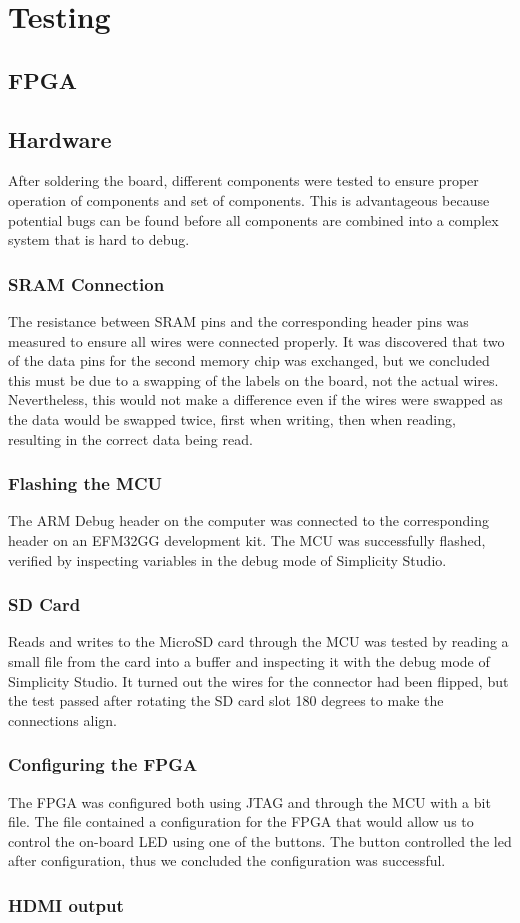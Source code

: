\section{Testing}


\subsection{FPGA}


\subsection{Hardware}
After soldering the board, different components were tested to ensure proper operation of components and set of components.
This is advantageous because potential bugs can be found before all components are combined into a complex system that is hard to debug.

\subsubsection{SRAM Connection}
The resistance between SRAM pins and the corresponding header pins was measured to ensure all wires were connected properly.
It was discovered that two of the data pins for the second memory chip was exchanged, but we concluded this must be due to a swapping of the labels on the board, not the actual wires.
Nevertheless, this would not make a difference even if the wires were swapped as the data would be swapped twice, first when writing, then when reading, resulting in the correct data being read.

\subsubsection{Flashing the MCU}
The ARM Debug header on the computer was connected to the corresponding header on an EFM32GG development kit. The MCU was successfully flashed, verified by inspecting variables in the debug mode of Simplicity Studio.

\subsubsection{SD Card}
Reads and writes to the MicroSD card through the MCU was tested by reading a small file from the card into a buffer and inspecting it with the debug mode of Simplicity Studio. It turned out the wires for the connector had been flipped, but the test passed after rotating the SD card slot 180 degrees to make the connections align.

\subsubsection{Configuring the FPGA}
The FPGA was configured both using JTAG and through the MCU with a bit file. The file contained a configuration for the FPGA that would allow us to control the on-board LED using one of the buttons. The button controlled the led after configuration, thus we concluded the configuration was successful.

\subsubsection{HDMI output}
